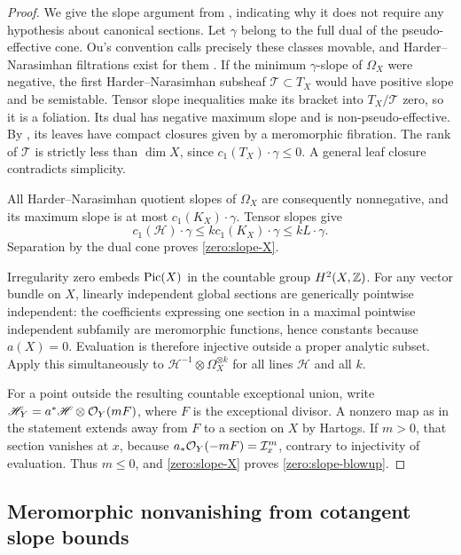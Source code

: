 \begin{proof}
We give the slope argument from \cite[Lemma~6.2]{K}, indicating why it
does not require any hypothesis about canonical sections.  Let
\(\gamma\) belong to the full dual of the pseudo-effective cone.
Ou's convention calls precisely these classes movable, and
Harder--Narasimhan filtrations exist for them
\cite[Definition~4.2 and Lemma~4.3]{Ou}.  If the minimum
\(\gamma\)-slope of \(\Omega_X\) were negative, the first
Harder--Narasimhan subsheaf \(\mathscr T\subset T_X\) would have
positive slope and be semistable.  Tensor slope inequalities make its
bracket into \(T_X/\mathscr T\) zero, so it is a foliation.  Its dual
has negative maximum slope and is non-pseudo-effective.  By
\cite[Theorem~1.4, Lemmas~4.3--4.4 and Proposition~4.5]{Ou}, its leaves have
compact closures given by a meromorphic fibration.  The rank of
\(\mathscr T\) is strictly less than \(\dim X\), since
\(c_1(T_X)\cdot\gamma\le0\).  A general leaf closure contradicts
simplicity.

All Harder--Narasimhan quotient slopes of \(\Omega_X\) are consequently
nonnegative, and its maximum slope is at most
\(c_1(K_X)\cdot\gamma\).  Tensor slopes give
\[
 c_1(\mathscr H)\cdot\gamma
 \le k c_1(K_X)\cdot\gamma\le kL\cdot\gamma.
\]
Separation by the dual cone proves \eqref{zero:slope-X}.

Irregularity zero embeds \(\operatorname{Pic}(X)\) in the countable group
\(H^2(X,\mathbb Z)\).  For any vector bundle on \(X\), linearly independent
global sections are generically pointwise independent: the coefficients
expressing one section in a maximal pointwise independent subfamily
are meromorphic functions, hence constants because \(a(X)=0\).
Evaluation is therefore injective outside a proper analytic subset.
Apply this simultaneously to
\(\mathscr H^{-1}\otimes\Omega_X^{\otimes k}\) for all lines
\(\mathscr H\) and all \(k\).

For a point outside the resulting countable exceptional union, write
\(\mathscr H_Y=a^*\mathscr H\otimes\mathcal O_Y(mF)\), where \(F\) is the
exceptional divisor.  A nonzero map as in the statement extends away
from \(F\) to a section on \(X\) by Hartogs.  If \(m>0\), that section
vanishes at \(x\), because \(a_*\mathcal O_Y(-mF)=\mathcal I_x^m\),
contrary to injectivity of evaluation.  Thus \(m\le0\), and
\eqref{zero:slope-X} proves \eqref{zero:slope-blowup}.
\end{proof}

\subsection{Meromorphic nonvanishing from cotangent slope bounds}

